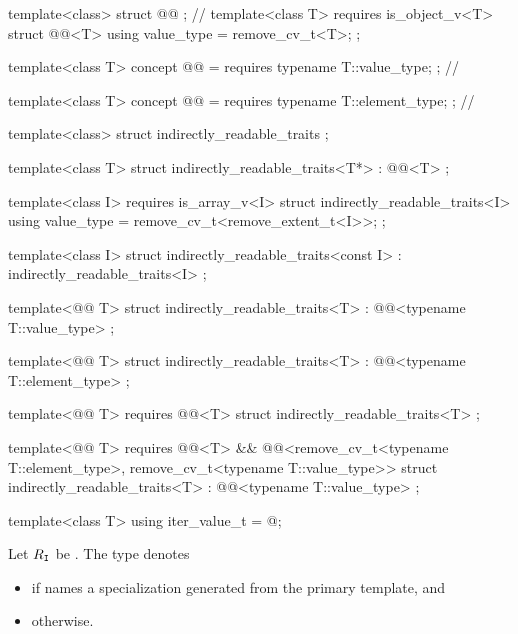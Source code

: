 %
\begin{codeblock}
template<class> struct @@ { };     // \expos
template<class T>
  requires is_object_v<T>
struct @@<T> {
  using value_type = remove_cv_t<T>;
};

template<class T>
  concept @@ = requires { typename T::value_type; };         // \expos

template<class T>
  concept @@ = requires { typename T::element_type; };     // \expos

template<class> struct indirectly_readable_traits { };

template<class T>
struct indirectly_readable_traits<T*>
  : @@<T> { };

template<class I>
  requires is_array_v<I>
struct indirectly_readable_traits<I> {
  using value_type = remove_cv_t<remove_extent_t<I>>;
};

template<class I>
struct indirectly_readable_traits<const I>
  : indirectly_readable_traits<I> { };

template<@@ T>
struct indirectly_readable_traits<T>
  : @@<typename T::value_type> { };

template<@@ T>
struct indirectly_readable_traits<T>
  : @@<typename T::element_type> { };

template<@@ T>
  requires @@<T>
struct indirectly_readable_traits<T> { };

template<@@ T>
  requires @@<T> &&
           @@<remove_cv_t<typename T::element_type>, remove_cv_t<typename T::value_type>>
struct indirectly_readable_traits<T>
  : @@<typename T::value_type> { };

template<class T> using iter_value_t = @\seebelow@;
\end{codeblock}

%
\pnum
Let $R_\tcode{I}$ be .
The type  denotes
\begin{itemize}
\item
{}
if  names a specialization
generated from the primary template, and

\item
{} otherwise.
\end{itemize}

